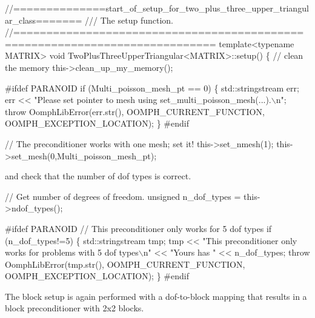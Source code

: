 \begin{DoxyCodeInclude}
 \textcolor{comment}{//==============start\_of\_setup\_for\_two\_plus\_three\_upper\_triangular\_class=======}\textcolor{comment}{}
\textcolor{comment}{ /// The setup function.}
\textcolor{comment}{} \textcolor{comment}{//============================================================================}
 \textcolor{keyword}{template}<\textcolor{keyword}{typename} MATRIX> 
 \textcolor{keywordtype}{void} TwoPlusThreeUpperTriangular<MATRIX>::setup()
 \{
  \textcolor{comment}{// clean the memory}
  this->clean\_up\_my\_memory();

\textcolor{preprocessor}{#ifdef PARANOID}
  \textcolor{keywordflow}{if} (Multi\_poisson\_mesh\_pt == 0)
   \{
    std::stringstream err;
    err << \textcolor{stringliteral}{"Please set pointer to mesh using set\_multi\_poisson\_mesh(...).\(\backslash\)n"};
    \textcolor{keywordflow}{throw} OomphLibError(err.str(),
                        OOMPH\_CURRENT\_FUNCTION,
                        OOMPH\_EXCEPTION\_LOCATION);
   \}
\textcolor{preprocessor}{#endif }
  
  \textcolor{comment}{// The preconditioner works with one mesh; set it!}
  this->set\_nmesh(1);
  this->set\_mesh(0,Multi\_poisson\_mesh\_pt);

\end{DoxyCodeInclude}


and check that the number of dof types is correct. 
\begin{DoxyCodeInclude}

  \textcolor{comment}{// Get number of degrees of freedom.}
  \textcolor{keywordtype}{unsigned} n\_dof\_types = this->ndof\_types();

\textcolor{preprocessor}{#ifdef PARANOID}
  \textcolor{comment}{// This preconditioner only works for 5 dof types}
  \textcolor{keywordflow}{if} (n\_dof\_types!=5)
   \{
    std::stringstream tmp;
    tmp << \textcolor{stringliteral}{"This preconditioner only works for problems with 5 dof types\(\backslash\)n"}
        << \textcolor{stringliteral}{"Yours has "} << n\_dof\_types;
    \textcolor{keywordflow}{throw} OomphLibError(tmp.str(),
                        OOMPH\_CURRENT\_FUNCTION,
                        OOMPH\_EXCEPTION\_LOCATION);
   \}
\textcolor{preprocessor}{#endif}

\end{DoxyCodeInclude}


The block setup is again performed with a dof-\/to-\/block mapping that results in a block preconditioner with 2x2 blocks.



